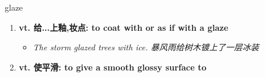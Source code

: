 
\begin{frame}
{\huge glaze}
\begin{center}
\begin{enumerate}\Large
  \item \textbf{vt. 给...上釉,妆点: to coat with or as if with a glaze}
  \begin{itemize}
    \item \em{\Large{The storm glazed trees with ice. 暴风雨给树木镀上了一层冰装}}
  \end{itemize}
  \item \textbf{vt. 使平滑: to give a smooth glossy surface to}
\end{enumerate}
\end{center}
\end{frame}
